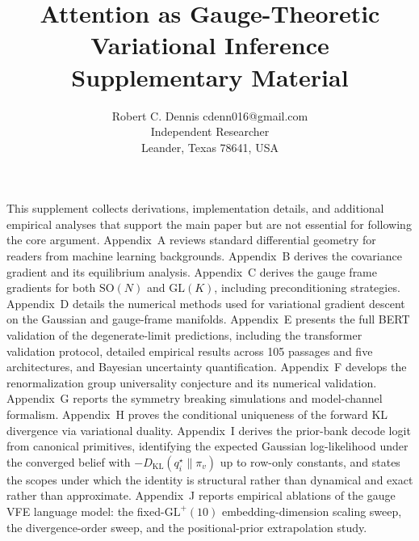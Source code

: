 \documentclass[twoside,11pt]{article}
\begin{document}

\title{Attention as Gauge-Theoretic Variational Inference\\[6pt]
\large Supplementary Material}

\author{\name Robert C. Dennis \email cdenn016@gmail.com \\
  \addr Independent Researcher\\
  \addr Leander, Texas 78641, USA}


\maketitle


This supplement collects derivations, implementation details, and additional empirical analyses that support the main paper but are not essential for following the core argument. Appendix~A reviews standard differential geometry for readers from machine learning backgrounds. Appendix~B derives the covariance gradient and its equilibrium analysis. Appendix~C derives the gauge frame gradients for both $\mathrm{SO}(N)$ and $\mathrm{GL}(K)$, including preconditioning strategies. Appendix~D details the numerical methods used for variational gradient descent on the Gaussian and gauge-frame manifolds. Appendix~E presents the full BERT validation of the degenerate-limit predictions, including the transformer validation protocol, detailed empirical results across 105 passages and five architectures, and Bayesian uncertainty quantification. Appendix~F develops the renormalization group universality conjecture and its numerical validation. Appendix~G reports the symmetry breaking simulations and model-channel formalism. Appendix~H proves the conditional uniqueness of the forward KL divergence via variational duality. Appendix~I derives the prior-bank decode logit from canonical primitives, identifying the expected Gaussian log-likelihood under the converged belief with $-D_{\mathrm{KL}}(q_i^{\star} \| \pi_v)$ up to row-only constants, and states the scopes under which the identity is structural rather than dynamical and exact rather than approximate. Appendix~J reports empirical ablations of the gauge VFE language model: the fixed-$\mathrm{GL}^+(10)$ embedding-dimension scaling sweep, the divergence-order sweep, and the positional-prior extrapolation study.

\appendix
\end{document}
